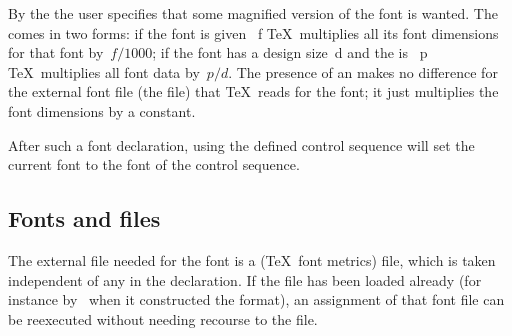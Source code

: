 By the  the user specifies that some
magnified version of the font is wanted. The  comes
in two forms: if the font is given ~{\italic f\/} \TeX\
multiplies all its font dimensions for that font by~$f/1000$; 
if the font
has a design size~{\italic d\/} and 
the  is ~{\italic p\/}
\TeX\ multiplies all font data by~$p/d$.
The presence of an  makes no difference for
the external font file (the  file)
that \TeX\ reads for the font; it just multiplies
the font dimensions by a constant.


After such a font declaration, using the defined control sequence
will set the current font to the font of the 
control sequence.

\subsection{Fonts and \n{tfm} files}

The external file needed for the font is a \n{tfm} 
(\TeX\ font metrics) file,
which is taken independent of any  
in the  declaration. If the 
file has been loaded already (for instance by \IniTeX\
when it constructed the format),
an assignment of that font file can be reexecuted
without needing recourse to the  file.

